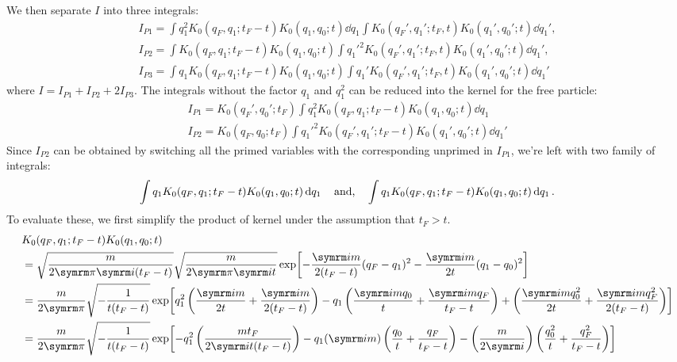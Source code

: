 We then separate $I$ into three integrals:
\begin{gather}
    I_{P1} = \int q_1^2K_0(q_F, q_1; t_F - t)K_0(q_1, q_0; t)\dd{q_1} \int K_0(q_F', q_1'; t_F, t)K_0(q_1', q_0'; t)\dd{q_1'}, \label{eq:spring_IP1}\\
    I_{P2} = \int K_0(q_F, q_1; t_F - t)K_0(q_1, q_0; t) \int q_1'^2K_0(q_F', q_1'; t_F, t)K_0(q_1', q_0'; t)\dd{q_1'}, \label{eq:spring_IP2}\\
    I_{P3} = \int q_1K_0(q_F, q_1; t_F - t)K_0(q_1, q_0; t) \int q_1'K_0(q_F', q_1'; t_F, t)K_0(q_1', q_0'; t) \dd{q_1'} \label{eq:spring_IP3}
\end{gather}
where $I = I_{P1} + I_{P2} + 2I_{P3}$. The integrals without the factor $q_1$ and $q_1^2$ can be reduced into the kernel for the free particle:
\begin{gather}
    I_{P1} = K_0(q_F', q_0'; t_F)\int q_1^2K_0(q_F, q_1; t_F - t)K_0(q_1, q_0; t)\dd{q_1} \\
    I_{P2} = K_0(q_F, q_0; t_F)\int q_1'^2 K_0(q_F', q_1'; t_F - t)K_0(q_1', q_0'; t)\dd{q_1'}
\end{gather}
Since $I_{P2}$ can be obtained by switching all the primed variables with the corresponding unprimed in $I_{P1}$, we're left with two family of integrals:
\begin{equation}
    \int q_1K_0(q_F, q_1; t_F - t)K_0(q_1, q_0; t)\dd{q_1} \quad\textrm{and,}\quad \int q_1K_0(q_F, q_1; t_F - t)K_0(q_1, q_0; t)\dd{q_1}. \label{eq:spring_family_of_integrals}
\end{equation}
To evaluate these, we first simplify the product of kernel under the assumption that $t_F > t$.
\begin{align}
    &K_0(q_F, q_1; t_F - t)K_0(q_1, q_0; t) \nonumber\\
    &= \sqrt{\frac{m}{2\cpi\im(t_F - t)}}\sqrt{\frac{m}{2\cpi\im t}}\exp[-\frac{\im m}{2(t_F - t)}(q_F - q_1)^2 - \frac{\im m}{2t}(q_1 - q_0)^2] \\
    &= \frac{m}{2\cpi}\sqrt{-\frac{1}{t(t_F - t)}} \exp[q_1^2\left(\frac{\im m}{2t} + \frac{\im m}{2(t_F - t)}\right) - q_1\left(\frac{\im m q_0}{t} + \frac{\im m q_F}{t_F - t}\right) + \left(\frac{\im m q_0^2}{2t} + \frac{\im m q_F^2}{2(t_F - t)}\right)] \nonumber \\
    &= \frac{m}{2\cpi}\sqrt{-\frac{1}{t(t_F - t)}} \exp[-q_1^2\left(\frac{m t_F}{2\im t(t_F - t)}\right) - q_1(\im m)\left(\frac{q_0}{t} + \frac{q_F}{t_F - t}\right) - \left(\frac{m}{2\im}\right)\left(\frac{q_0^2}{t} + \frac{q_F^2}{t_F - t}\right)] \nonumber
\end{align}
